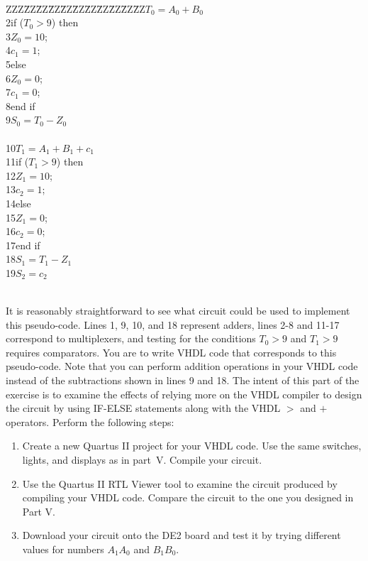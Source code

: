 \documentclass[psfig,10pt,fullpage]{article}
\begin{document}
~\\
\begin{center}
\begin{minipage}[t]{12.5 cm}
\begin{tabbing}
ZZZ\=ZZ\=ZZ\=ZZ\=ZZ\=ZZ\=ZZ\=ZZ\=ZZ\=ZZ\=ZZ\>$T_0 = A_0 + B_0$ \\
2\>if ($T_0 > 9$) then\\
3\>\>$Z_0 = 10$;\\
4\>\>$c_1 = 1$;\\
5\>else\\
6\>\>$Z_0 = 0$;\\
7\>\>$c_1 = 0$;\\
8\>end if\\
9\>$S_0 = T_0 - Z_0$\\
~\\
10\>$T_1 = A_1 + B_1 + c_1$ \\
11\>if ($T_1 > 9$) then\\
12\>\>$Z_1 = 10$;\\
13\>\>$c_2 = 1$;\\
14\>else\\
15\>\>$Z_1 = 0$;\\
16\>\>$c_2 = 0$;\\
17\>end if\\
18\>$S_1 = T_1 - Z_1$\\
19\>$S_2 = c_2$\\
\end{tabbing}
\end{minipage}
\end{center}
~\\
It is reasonably straightforward to see what circuit could be used to implement this
pseudo-code. Lines 1, 9, 10, and 18 represent adders, lines 2-8 and 11-17 correspond to
multiplexers, and testing for the conditions $T_0 > 9$ and $T_1 > 9$ requires comparators.
You are to write VHDL code that corresponds to this pseudo-code. Note that you can
perform addition operations in your VHDL code instead of the subtractions shown 
in lines 9 and 18. The intent of this part of the exercise is
to examine the effects of relying more on the VHDL compiler to design the circuit by using
IF-ELSE statements along with the VHDL $>$ and $+$ operators. 
Perform the following steps:

\begin{enumerate}
\item Create a new Quartus II project for your VHDL code. Use the same switches, lights, and
displays as in part~V. Compile your circuit.
\item Use the Quartus II RTL Viewer tool to examine the circuit produced by compiling your
VHDL code. Compare the circuit to the one you designed in Part V.
\item Download your circuit onto the DE2 board and test it by trying different values for 
numbers $A_1 A_0$ and $B_1 B_0$.
\end{enumerate}
\end{document}
